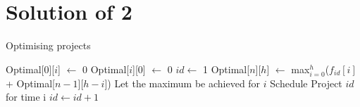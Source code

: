 \documentclass[a4paper,10pt]{article}
\begin{document}
\section{Solution of 2}
\begin{algorithm}
 \caption{Optimising projects}
 \begin{algorithmic}
     \State Optimal[$0$][$i$] $\gets$ 0
    \EndFor
     \State Optimal[$i$][$0$] $\gets$ 0
    \EndFor
    \State $id \gets$ 1
      \State Optimal[$n$][$h$] $\gets$ max$_{i=0}^{h}$($f_{id}[i]$ + Optimal[$n-1$][$h-i$])
      \State Let the maximum be achieved for $i$
      \State Schedule Project $id$ for time i
      \State $id \gets id + 1$
     \EndFor
    \EndFor
  \EndFunction
 \end{algorithmic}
\end{algorithm}
\end{document}
